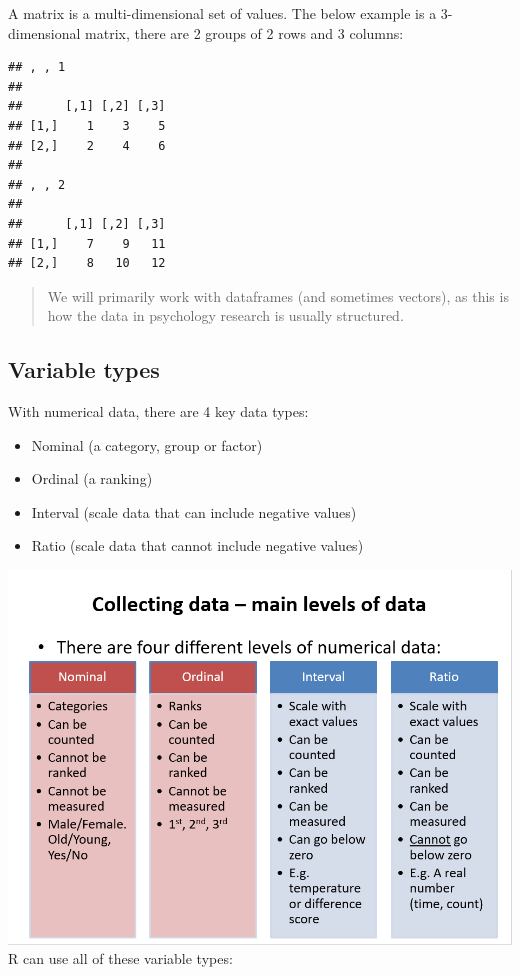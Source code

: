 \documentclass[
]{book}
\providecommand{\tightlist}{%
  \setlength{\itemsep}{0pt}\setlength{\parskip}{0pt}}
\begin{document}
A matrix is a multi-dimensional set of values. The below example is a 3-dimensional matrix, there are 2 groups of 2 rows and 3 columns:

\begin{verbatim}
## , , 1
## 
##      [,1] [,2] [,3]
## [1,]    1    3    5
## [2,]    2    4    6
## 
## , , 2
## 
##      [,1] [,2] [,3]
## [1,]    7    9   11
## [2,]    8   10   12
\end{verbatim}

\begin{quote}
We will primarily work with dataframes (and sometimes vectors), as this is how the data in psychology research is usually structured.
\end{quote}

\hypertarget{variable-types}{%
\subsection{Variable types}\label{variable-types}}

With numerical data, there are 4 key data types:

\begin{itemize}
\tightlist
\item
  Nominal (a category, group or factor)
\item
  Ordinal (a ranking)
\item
  Interval (scale data that can include negative values)
\item
  Ratio (scale data that cannot include negative values)
\end{itemize}

\includegraphics{images/dataTypes.png}
R can use all of these variable types:
\end{document}

